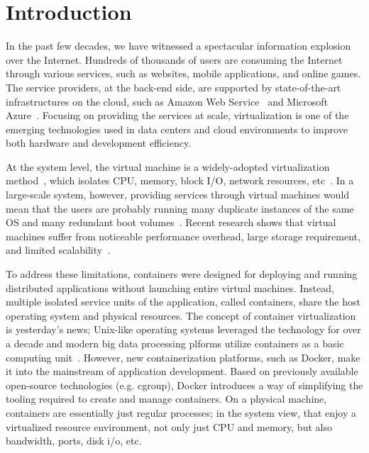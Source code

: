 \section{Introduction}
In the past few decades, we have witnessed a spectacular information explosion over the Internet. 
Hundreds of thousands of users are consuming the Internet through various services, such as websites, mobile applications, and online games.
The service providers, at the back-end side, are supported by state-of-the-art infrastructures on the cloud, such as Amazon Web Service~\cite{aws} and
Microsoft Azure~\cite{azure}. 
Focusing on providing the services at scale, 
virtualization is one of the emerging technologies used in data centers and cloud environments to 
improve both hardware and development efficiency.

At the system level, the virtual machine is a widely-adopted virtualization method~\cite{vm}, which isolates CPU, memory, 
block I/O, network resources, etc~\cite{jithin2014virtual}.
In a large-scale system, however,
providing services through virtual machines would mean that the users are probably 
running many duplicate instances of the same OS and many redundant boot volumes~\cite{medina2014survey}. 
Recent research shows that virtual machines suffer from noticeable performance overhead, large storage requirement, and 
limited scalability~\cite{xu2014managing}. 

To address these limitations, containers were designed for deploying
and running distributed applications without launching entire virtual machines. 
Instead, multiple isolated service units of the application, 
called containers, share the host operating system and physical resources.
The concept of container virtualization is yesterday's news;
Unix-like operating systems leveraged the technology for over a decade and modern 
big data processing plforms utilize containers as a basic computing unit~\cite{wang2014fresh, wang2015omo, wang2017seina}. 
However, new containerization platforms, such as Docker, make it into the mainstream of application development.
Based on previously available open-source technologies 
(e.g. cgroup), Docker introduces a way of simplifying the tooling required to create and manage containers.
On a physical machine, containers are essentially just regular processes; in the system view, that enjoy a virtualized resource environment, not only just CPU and
memory, but also bandwidth, ports, disk i/o, etc. 

